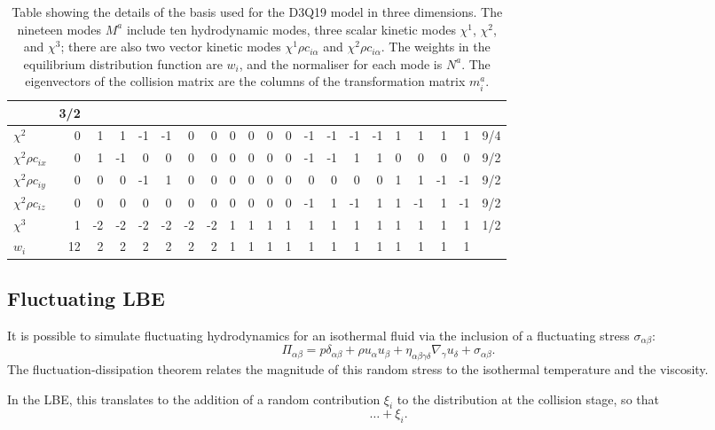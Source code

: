 \begin{table}[t]
\begin{tabular}{|l||r|rrrrrr|rrrr|rrrr|rrrr|r||}
& 3/2\\
\hline
$\chi^2$ & 0 &  1 &  1 &  -1&  -1 &  0 &  0 & 
         0 &  0 &  0 &  0 &  -1 &  -1 & -1 & -1 & 1 & 1 & 1 & 1
& 9/4\\
\hline
$\chi^2 \rho c_{ix}$ & 0 &  1 &  -1 &  0&  0 &  0 &  0 & 
         0 &  0 &  0 &  0 &  -1 &  -1 & 1 & 1 & 0 & 0 & 0 & 0
& 9/2\\
\hline
$\chi^2 \rho c_{iy}$ & 0 &  0 &  0 & -1&   1 &  0 &  0 & 
         0 &  0 &  0 &  0 &   0 &  0 & 0 & 0 & 1 &  1 & -1 & -1
& 9/2\\
\hline
$\chi^2 \rho c_{iz}$ & 0 &  0 &  0 &  0&  0 &  0 &  0 & 
         0 &  0 &  0 &  0 &  -1 &  1 & -1 & 1 & 1 & -1 & 1 & -1
& 9/2\\
\hline
$\chi^3$ & 1 &  -2 &  -2 &  -2&  -2 &  -2 &  -2 & 
         1 &  1 &  1 &  1 &  1 &  1 & 1 & 1 & 1 & 1 & 1 & 1
& 1/2\\
\hline\hline
$w_i$ & 12 & 2 & 2 & 2 & 2 & 2 & 2 & 
1 & 1 & 1 & 1 & 1 & 1 & 1 & 1 & 1 & 1 & 1 & 1
& \\
\hline\hline
\end{tabular}
\caption{Table showing the details of the basis used for the D3Q19 model in
three dimensions. The nineteen modes $M^a$ include ten hydrodynamic modes,
three scalar kinetic modes $\chi^1$, $\chi^2$, and $\chi^3$; there are also
two vector kinetic modes $\chi^1 \rho c_{i\alpha}$
and $\chi^2 \rho c_{i\alpha}$. The weights in the equilibrium distribution
function are $w_i$, and the normaliser for each mode is $N^a$. The
eigenvectors of the collision matrix are the columns of the transformation
matrix $m^a_i$.
\label{table-d3q19-spec}
}
\end{table}


\subsection{Fluctuating LBE}

It is possible \cite{adhikari2005} to simulate fluctuating
hydrodynamics for an isothermal fluid via the inclusion of
a fluctuating stress $\sigma_{\alpha\beta}$:
\begin{equation}
\Pi_{\alpha\beta} = p\delta_{\alpha\beta} + \rho u_\alpha u_\beta
+ \eta_{\alpha\beta\gamma\delta} \nabla_\gamma u_\delta + \sigma_{\alpha\beta}.
\end{equation}
The fluctuation-dissipation theorem relates the magnitude of this
random stress to the isothermal temperature and the viscosity.

In the LBE, this translates to the addition of a random contribution
$\xi_i$ to the distribution at the collision stage, so that
\begin{equation}
\ldots + \xi_i.
\end{equation}

